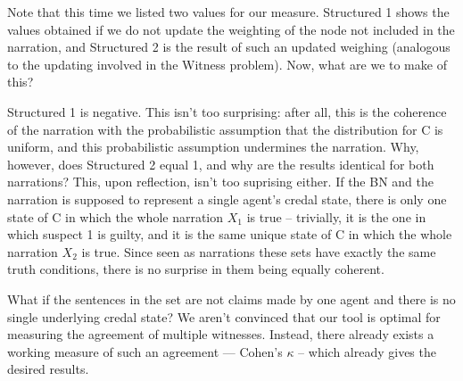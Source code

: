 \documentclass[
  10pt,
]{scrartcl}
\begin{document}
\begin{table}[H]

\caption{\label{tab:depthDesiderata}Desiderata satisfaction for the Depth problem.}
\centering
{}
\end{table}


Note that this time we listed two values for our measure. \textsf{Structured 1} shows the values obtained if we do not update the weighting of the node not included in the narration, and \textsf{Structured 2} is the result of such an updated weighing (analogous to the updating involved in the \textsf{Witness} problem). Now, what are we to make of this?

\textsf{Structured 1} is negative. This isn't too surprising: after all, this is the coherence of the narration with the probabilistic assumption that the distribution for \textsf{C} is uniform, and this probabilistic assumption undermines the narration. Why, however, does \textsf{Structured 2} equal 1, and why are the results identical for both narrations? This, upon reflection, isn't too suprising either. If the BN and the narration is supposed to represent a single agent's credal state, there is only one state of \textsf{C} in which the whole narration \(X_1\) is true -- trivially, it is the one in which suspect 1 is guilty, and it is the same unique state of \textsf{C} in which the whole narration \(X_2\) is true. Since seen as narrations these sets have exactly the same truth conditions, there is no surprise in them being equally coherent.

What if the sentences in the set are not claims made by one agent and there is no single underlying credal state? We aren't convinced that our tool is optimal for measuring the agreement of multiple witnesses. Instead, there already exists a working measure of such an agreement --- Cohen's \(\kappa\) -- which already gives the desired results.
\end{document}
